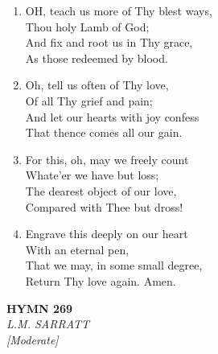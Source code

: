 \begin{enumerate}
    \item OH, teach us more of Thy blest ways, \\
        Thou holy Lamb of God; \\
        And fix and root us in Thy grace, \\
        As those redeemed by blood.

    \item Oh, tell us often of Thy love, \\
        Of all Thy grief and pain; \\
        And let our hearts with joy confess \\
        That thence comes all our gain.

    \item For this, oh, may we freely count \\
        Whate'er we have but loss; \\
        The dearest object of our love, \\
        Compared with Thee but dross!

    \item Engrave this deeply on our heart \\
        With an eternal pen, \\
        That we may, in some small degree, \\
        Return Thy love again. Amen.

\end{enumerate}

\newpage
\begin{center}
    {\Large \textbf{HYMN 269}}
    \\
    \textit{L.M. SARRATT}
    \\
    \textit{\small [Moderate]}
\end{center}
\vspace{1em}

